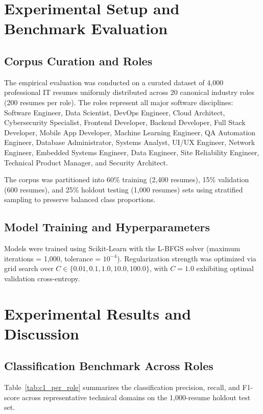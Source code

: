 \documentclass[conference]{IEEEtran}
\begin{document}
\section{Experimental Setup and Benchmark Evaluation}

\subsection{Corpus Curation and Roles}
The empirical evaluation was conducted on a curated dataset of 4,000 professional IT resumes uniformly distributed across 20 canonical industry roles (200 resumes per role). The roles represent all major software disciplines: Software Engineer, Data Scientist, DevOps Engineer, Cloud Architect, Cybersecurity Specialist, Frontend Developer, Backend Developer, Full Stack Developer, Mobile App Developer, Machine Learning Engineer, QA Automation Engineer, Database Administrator, Systems Analyst, UI/UX Engineer, Network Engineer, Embedded Systems Engineer, Data Engineer, Site Reliability Engineer, Technical Product Manager, and Security Architect.

The corpus was partitioned into 60\% training (2,400 resumes), 15\% validation (600 resumes), and 25\% holdout testing (1,000 resumes) sets using stratified sampling to preserve balanced class proportions.

\subsection{Model Training and Hyperparameters}
Models were trained using Scikit-Learn with the L-BFGS solver (maximum iterations = 1,000, tolerance = $10^{-4}$). Regularization strength was optimized via grid search over $C \in \{0.01, 0.1, 1.0, 10.0, 100.0\}$, with $C = 1.0$ exhibiting optimal validation cross-entropy.

\section{Experimental Results and Discussion}

\subsection{Classification Benchmark Across Roles}
Table~\ref{tab:c1_per_role} summarizes the classification precision, recall, and F1-score across representative technical domains on the 1,000-resume holdout test set.
\end{document}
